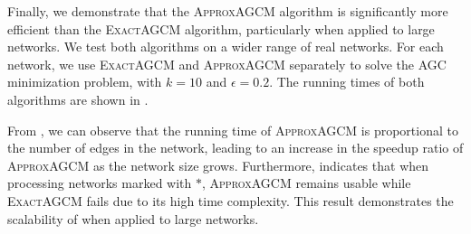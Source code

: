 \documentclass[10pt,journal,compsoc,twocolumn,twoside]{IEEEtran}
\begin{document}
Finally, we demonstrate that the \textsc{ApproxAGCM} algorithm is significantly more efficient than the \textsc{ExactAGCM} algorithm, particularly when applied to large networks.
We test both algorithms on a wider range of real networks.
For each network, we use \textsc{ExactAGCM} and \textsc{ApproxAGCM} separately to solve the AGC minimization problem, with \(k=10\) and \(\epsilon=0.2\).
The running times of both algorithms are shown in .

From , we can observe that the running time of \textsc{ApproxAGCM} is proportional to the number of edges in the network, leading to an increase in the speedup ratio of \textsc{ApproxAGCM} as the network size grows.
Furthermore,  indicates that when processing networks marked with \(\ast\),
\textsc{ApproxAGCM} remains usable while \textsc{ExactAGCM} fails due to its high time complexity.
This result demonstrates the scalability of  when applied to large networks.
\end{document}
